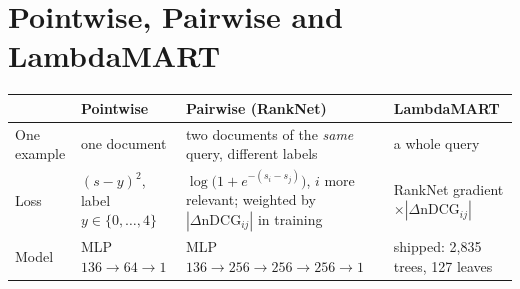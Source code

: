 \documentclass[10pt,a4paper]{article}
\begin{document}
\section{Pointwise, Pairwise and LambdaMART}
\begin{center}
\normalsize\renewcommand{\arraystretch}{1.35}
\begin{tabularx}{\textwidth}{@{}l>{\raggedright\arraybackslash}X>{\raggedright\arraybackslash}X>{\raggedright\arraybackslash}X@{}}
\toprule
 & \textbf{Pointwise} & \textbf{Pairwise (RankNet)} & \textbf{LambdaMART}\\
\midrule
One example & one document & two documents of the \emph{same} query, different labels & a whole query \\
Loss & $(s-y)^2$, label $y\in\{0,\dots,4\}$ & $\log\bigl(1+e^{-(s_i-s_j)}\bigr)$, $i$ more relevant; weighted by $|\Delta\mathrm{nDCG}_{ij}|$ in training & RankNet gradient $\times|\Delta\mathrm{nDCG}_{ij}|$ \\
Model & MLP $136{\to}64{\to}1$ & MLP $136{\to}256{\to}256{\to}256{\to}1$ & shipped: 2{,}835 trees, 127 leaves \\
\bottomrule
\end{tabularx}
\end{center}
\end{document}
